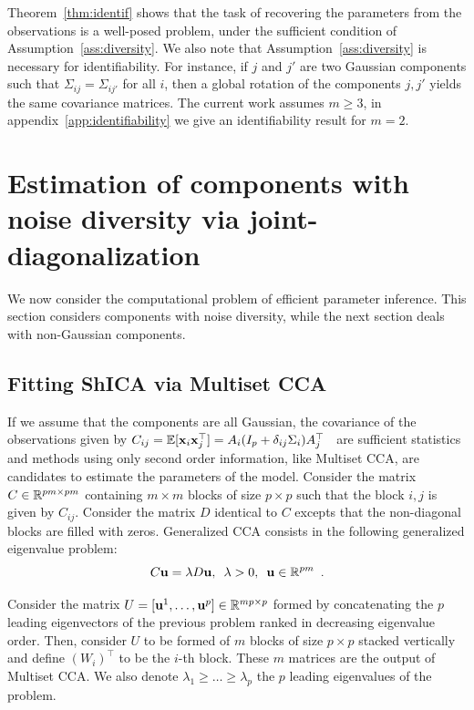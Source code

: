 \documentclass{report}
\begin{document}
{%
Theorem~\ref{thm:identif} shows that the task of recovering the parameters from the observations is a well-posed problem, under the sufficient condition of Assumption~\ref{ass:diversity}.  We also note that Assumption~\ref{ass:diversity} is necessary for identifiability. For instance, if $j$ and $j'$ are two Gaussian components such that $\Sigma_{ij} = \Sigma_{ij'}$ for all $i$, then a global rotation of the components $j, j'$ yields the same covariance matrices. The current work assumes $m \geq 3$, in appendix~\ref{app:identifiability} we give an identifiability result for $m=2$.



\section{Estimation of components with noise diversity via joint-diagonalization}

We now consider the computational problem of efficient parameter inference. This section considers components with noise diversity, while the next section deals with non-Gaussian components.


\subsection{Fitting ShICA via Multiset CCA}
If we assume that the components are all Gaussian, %
the covariance of the observations given by
$C_{ij}=  \mathbb{E}[\mathbf{x}_i\mathbf{x}_j^\top] = A_i(I_p + \delta_{ij}\Sigma_i)A_j^{\top}\enspace
$ are sufficient statistics and methods using only second order information, like Multiset CCA, are candidates to estimate the parameters of the model.
Consider the
matrix $C \in \mathbb{R}^{pm \times pm}$ containing $m \times m$ blocks of size $p
\times p$
such that the block $i,j$ is given by $C_{ij}$. Consider the matrix $D$ identical to $C$ excepts that the non-diagonal blocks are filled with zeros. 
Generalized CCA consists in the following generalized eigenvalue problem:
\begin{equation}
\label{eq:eigv}
    C \mathbf{u} = \lambda D\mathbf{u},\enspace \lambda > 0,\enspace \mathbf{u}\in\mathbb{R}^{pm} \enspace .
\end{equation}
  
Consider the matrix $U = [\mathbf{u}^1, \dots, \mathbf{u}^p] \in \mathbb{R}^{mp \times p}$ formed by concatenating the $p$ leading eigenvectors of the previous problem ranked in decreasing eigenvalue order. Then, consider $U$ to be formed of $m$ blocks of size $p \times p$ stacked vertically and define $(W_i)^{\top}$ to be the $i$-th block. These $m$ matrices are the output of Multiset CCA. We also denote $\lambda_1 \geq \dots \geq \lambda_p$ the $p$ leading eigenvalues of the problem.

}
\end{document}
